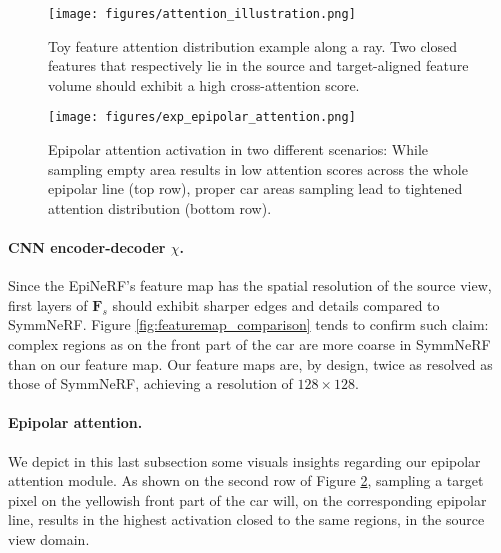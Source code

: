 \begin{figure*}[htb!]
  \centering
  \begin{subfigure}[t]{0.48\linewidth}
    \texttt{[image: figures/attention\_illustration.png]}
    \caption{Toy feature attention distribution example along a ray. Two closed features that respectively lie in the source and target-aligned feature volume should exhibit a high cross-attention score.}
    \label{fig:attention-illustration}
  \end{subfigure}
  \hfill
  \begin{subfigure}[t]{0.48\linewidth}
    \center
    \texttt{[image: figures/exp\_epipolar\_attention.png]}
    \caption{Epipolar attention activation in two different scenarios: While sampling empty area results in low attention scores across the whole epipolar line (top row), proper car areas sampling lead to tightened attention distribution (bottom row).}
    \label{fig:attention-practice}
  \end{subfigure}
  \caption{ \ref{fig:attention-illustration} Source-target feature attention conceptual idea along a ray. \ref{fig:attention-practice} In-practice epipolar-based attention distribution on two instances.}
  \label{fig:attention}
\end{figure*}





\paragraph{CNN encoder-decoder $\chi$.}
Since the EpiNeRF's feature map has the spatial resolution of the source view, first layers of $\textbf{F}_{s}$ should exhibit sharper edges and details compared to SymmNeRF. Figure \ref{fig:featuremap_comparison} tends to confirm such claim: complex regions as on the front part of the car are more coarse in SymmNeRF than on our feature map. Our feature maps are, by design, twice as resolved as those of SymmNeRF, achieving a resolution of $128\times128$. 


\paragraph{Epipolar attention.}
We depict in this last subsection some visuals insights regarding our epipolar attention module. As shown on the second row of Figure \ref{fig:attention-practice}, sampling a target pixel on the yellowish front part of the car will, on the corresponding epipolar line, results in the highest activation closed to the same regions, in the source view domain. 

